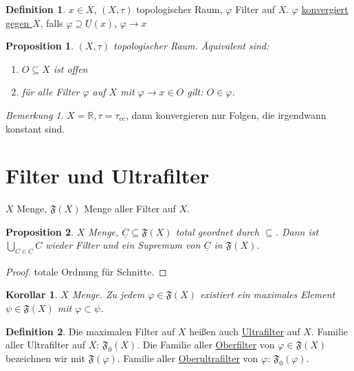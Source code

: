\documentclass[12pt]{scrartcl}%
\newtheorem{prop}{Proposition}
\newtheorem{korollar}{Korollar}
\theoremstyle{definition}
\newtheorem*{defn}{Definition}
\theoremstyle{remark}
\newtheorem*{nb}{Bemerkung}
\newcommand{\filterset}{\mathfrak{F}}
\begin{document}
\begin{defn}
    $x\in X$, $(X,\tau)$ topologischer Raum, $\varphi$ Filter auf $X$. $\varphi$ \underline{konvergiert gegen $X$}, falls $\varphi\supseteq \underline{U}(x)$, $\varphi \to x$
\end{defn}

\begin{prop}
    $(X,\tau)$ topologischer Raum. Äquivalent sind:

    \begin{enumerate}[label=(\arabic*)]
        \item $O\subseteq X$ ist offen
        \item für alle Filter $\varphi$ auf $X$ mit $\varphi\to x\in O$ gilt: $O\in\varphi$.
    \end{enumerate}
\end{prop}

\begin{nb}
    $X=\mathbb{R}, \tau=\tau_\text{cc}$, dann konvergieren nur Folgen, die irgendwann konstant sind.
\end{nb}

\section*{Filter und Ultrafilter}

$X$ Menge, $\filterset(X)$ Menge aller Filter auf $X$.

\begin{prop}
    $X$ Menge, $\underline{C}\subseteq \filterset(X)$ total geordnet durch $\subseteq$. Dann ist $\bigcup_{C\in\underline{C}} C$ wieder Filter und ein Supremum von $\underline{C}$ in $\filterset(X)$.
\end{prop}

\begin{proof}
    totale Ordnung für Schnitte.
\end{proof}

\begin{korollar}
    $X$ Menge. Zu jedem $\varphi\in\filterset(X)$ existiert ein maximales Element $\psi\in\filterset(X)$ mit $\varphi\subset \psi$.
\end{korollar}

\begin{defn}
    Die maximalen Filter auf $X$ heißen auch \underline{Ultrafilter} auf $X$. Familie aller Ultrafilter auf $X$: $\filterset_0(X)$. Die Familie aller \underline{Oberfilter} von $\varphi\in\filterset(X)$ bezeichnen wir mit $\filterset(\varphi)$. Familie aller \underline{Oberultrafilter} von $\varphi$: $\filterset_0(\varphi)$.
\end{defn}
\end{document}
